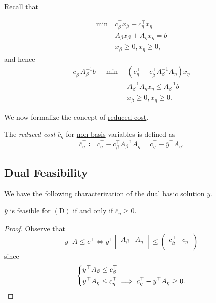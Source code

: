 Recall that
\begin{prev}
	\[
		\begin{aligned}
			\min~ & c^{\top}_{\beta}x_{\beta} + c^{\top}_{\eta}x_{\eta} \\
			      & A_{\beta}x_{\beta} + A_{\eta}x_{\eta} = b           \\
			      & x_{\beta}\geq 0, x_{\eta}\geq 0,
		\end{aligned}
	\]
	and hence
	\[
		\begin{aligned}
			c^{\top}_{\beta}A^{-1}_{\beta}b + \min~ & (c_{\eta}^{\top} - c_{\beta}^{\top}A^{-1}_{\beta}A_{\eta})x_{\eta} \\
			                                        & A^{-1}_{\beta}A_{\eta}x_{\eta} \leq A^{-1}_{\beta}b                \\
			                                        & x_{\beta}\geq 0, x_{\eta}\geq 0.
		\end{aligned}
	\]
\end{prev}

We now formalize the concept of \hyperref[note:reduced-cost]{reduced cost}.

\begin{definition}\label{def:reduced-cost}
	The \emph{reduced cost} \(\overline{c}_{\eta}\) for \hyperref[def:non-basis]{non-basis} variables is defined as
	\[
		\overline{c}_{\eta}^{\top} \coloneqq c_{\eta}^{\top} - c_{\beta}^{\top} A^{-1}_{\beta}A_{\eta} = c_{\eta}^{\top} - \overline{y}^{\top}A_{\eta}.
	\]
\end{definition}

\subsection{Dual Feasibility}
We have the following characterization of the \hyperref[def:dual-basic-solution]{dual basic solution} \(\overline{y} \).

\begin{lemma}\label{lma:lec7-2}
	\(\overline{y}\) is \hyperref[def:feasible-solution]{feasible} for \((\mathrm{D})\) if and only if \(\overline{c}_{\eta}\geq 0\).
\end{lemma}
\begin{proof}
	Observe that
	\[
		y^{\top}A\leq c^{\top} \iff y^{\top}\begin{bmatrix}
			A_{\beta} & A_{\eta} \\
		\end{bmatrix}\leq \begin{pmatrix}
			c_{\beta}^{\top} & c_{\eta}^{\top} \\
		\end{pmatrix}
	\]
	since
	\[
		\begin{dcases}
			y^{\top} A_{\beta} \leq c_{\beta}^{\top} \\
			y^{\top} A_{\eta}  \leq c_{\eta}^{\top} \implies c_{\eta}^{\top} - y^{\top}A_{\eta}\geq 0.
		\end{dcases}
	\]
\end{proof}

